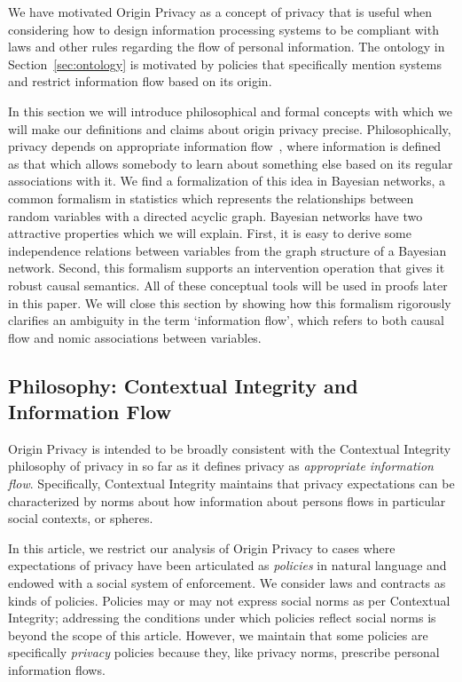 \documentclass[../thesis.tex]{subfiles}
\begin{document}
We have motivated Origin Privacy as a concept of privacy
that is useful when considering how to design
information processing systems to be compliant with
laws and other rules regarding the flow of personal 
information.
The ontology in Section~\ref{sec:ontology} is motivated
by policies that specifically mention systems and
restrict information flow based on its origin.

In this section we will introduce philosophical and formal
concepts with which we will make our definitions and claims
about origin privacy precise.
Philosophically, privacy depends on appropriate
information flow~\cite{nissenbaum09book}, where information is defined
as that which allows somebody to learn about something else
based on its regular associations with it.
We find a formalization of this idea in Bayesian networks,
a common formalism in statistics which represents the
relationships between random variables with a directed
acyclic graph.
Bayesian networks have two attractive properties which
we will explain.
First, it is easy to derive some independence relations
between variables from the graph structure of a Bayesian
network.
Second, this formalism supports an intervention operation
that gives it robust causal semantics.
All of these conceptual tools will be used in proofs
later in this paper.
We will close this section by showing how this formalism
rigorously clarifies an ambiguity in the term `information flow',
which refers to both causal flow and nomic associations between
variables.

\subsection{Philosophy: Contextual Integrity and Information Flow}

Origin Privacy is intended to be broadly consistent
with the Contextual Integrity \cite{nissenbaum09book}
philosophy of privacy in so far as it defines privacy
as \emph{appropriate information flow}.
Specifically, Contextual Integrity maintains that
privacy expectations can be characterized by norms
about how information about persons flows in particular
social contexts, or spheres.

In this article, we restrict our analysis of Origin Privacy
to cases where expectations of privacy have been articulated
as \emph{policies} in natural language and endowed with a 
social system of enforcement.
We consider laws and contracts as kinds of policies.
Policies may or may not express social norms as per
Contextual Integrity; addressing the conditions under
which policies reflect social norms is beyond the scope
of this article.
However, we maintain that some policies are specifically
\emph{privacy} policies because they, like privacy norms,
prescribe personal information flows. 
\end{document}

